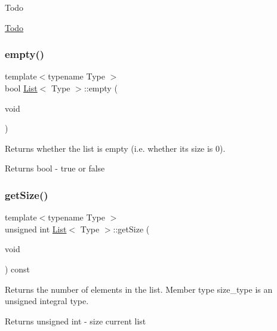 \begin{DoxyRefDesc}{Todo}
\item[\hyperlink{todo__todo000001}{Todo}]\end{DoxyRefDesc}
\mbox{\label{classList_a9326434dfbb5adf23aac5040e9d7a8f7}} 
\subsubsection{\texorpdfstring{empty()}{empty()}}
{\footnotesize\ttfamily template$<$typename Type $>$ \\
bool \hyperlink{classList}{List}$<$ Type $>$\+::empty (\begin{DoxyParamCaption}\item[{void}]{ }\end{DoxyParamCaption})}



Returns whether the list is empty (i.\+e. whether its size is 0). 

\begin{DoxyReturn}{Returns}
bool -\/ true or false 
\end{DoxyReturn}
\mbox{\label{classList_a261ca8c729d011b0ff08a4da4d5b9d2f}} 
\subsubsection{\texorpdfstring{get\+Size()}{getSize()}}
{\footnotesize\ttfamily template$<$typename Type $>$ \\
unsigned int \hyperlink{classList}{List}$<$ Type $>$\+::get\+Size (\begin{DoxyParamCaption}\item[{void}]{ }\end{DoxyParamCaption}) const}



Returns the number of elements in the list. Member type size\+\_\+type is an unsigned integral type. 

\begin{DoxyReturn}{Returns}
unsigned int -\/ size current list 
\end{DoxyReturn}
\mbox{\label{classList_afef72ae14d1dc037bfda14ec555f4856}} 
